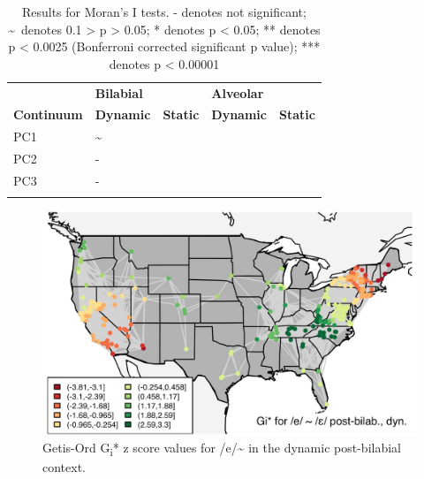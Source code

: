 \documentclass[output=paper]{LSP/langsci}
\begin{document}
\begin{table}
\begin{tabular}{lllll} & {\bfseries Bilabial} &  & {\bfseries Alveolar} & \\
\lsptoprule
{\bfseries Continuum} & {\bfseries Dynamic} & {\bfseries Static} & {\bfseries Dynamic} & {\bfseries Static}\\
{\mdseries PC1} & \multicolumn{4}{l}{ \~{}\par}\\
{\mdseries PC2} & \multicolumn{4}{l}{ {}-\par}\\
{\mdseries PC3} & \multicolumn{4}{l}{ {}-\par}\\
\lspbottomrule
\end{tabular}
\caption{Results for Moran’s I tests. {}- denotes not significant; \textasciitilde ~denotes 0.1 {\textgreater} p {\textgreater} 0.05; * denotes p {\textless} 0.05; ** denotes p {\textless} 0.0025 (Bonferroni corrected significant p value); *** denotes p {\textless} 0.00001}
\label{tab:2}
\end{table}

 
\begin{figure}
\includegraphics[width=\textwidth]{illustrations/kend_frid_fig3}
\caption{Getis-Ord G\textsubscript{i}* z score values for /e/\~{}
in the dynamic post-bilabial context.}
\label{fig:3}
\end{figure}
\end{document}
